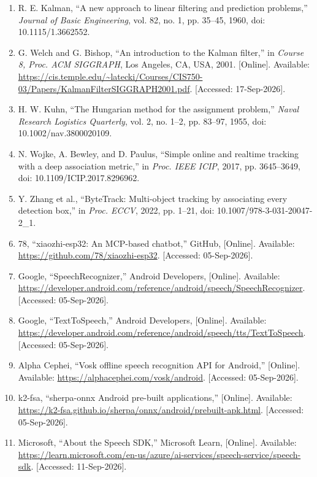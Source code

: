 \begin{enumerate}
    \item \label{ref:kalman} R. E. Kalman, ``A new approach to linear filtering and prediction problems,'' \textit{Journal of Basic Engineering}, vol. 82, no. 1, pp. 35--45, 1960, doi: 10.1115/1.3662552.
\item \label{ref:welch_bishop_kalman} G. Welch and G. Bishop, ``An introduction to the Kalman filter,'' in \textit{Course 8, Proc. ACM SIGGRAPH}, Los Angeles, CA, USA, 2001. [Online]. Available: \url{https://cis.temple.edu/~latecki/Courses/CIS750-03/Papers/KalmanFilterSIGGRAPH2001.pdf}. [Accessed: 17-Sep-2026].
    \item \label{ref:hungarian} H. W. Kuhn, ``The Hungarian method for the assignment problem,'' \textit{Naval Research Logistics Quarterly}, vol. 2, no. 1--2, pp. 83--97, 1955, doi: 10.1002/nav.3800020109.
    \item \label{ref:deepsort} N. Wojke, A. Bewley, and D. Paulus, ``Simple online and realtime tracking with a deep association metric,'' in \textit{Proc. IEEE ICIP}, 2017, pp. 3645--3649, doi: 10.1109/ICIP.2017.8296962.
    \item \label{ref:bytetrack} Y. Zhang et al., ``ByteTrack: Multi-object tracking by associating every detection box,'' in \textit{Proc. ECCV}, 2022, pp. 1--21, doi: 10.1007/978-3-031-20047-2\_1.
    \item \label{ref:xiaozhi} 78, ``xiaozhi-esp32: An MCP-based chatbot,'' GitHub, [Online]. Available: \url{https://github.com/78/xiaozhi-esp32}. [Accessed: 05-Sep-2026].
    \item \label{ref:android_speech} Google, ``SpeechRecognizer,'' Android Developers, [Online]. Available: \url{https://developer.android.com/reference/android/speech/SpeechRecognizer}. [Accessed: 05-Sep-2026].
    \item \label{ref:android_tts} Google, ``TextToSpeech,'' Android Developers, [Online]. Available: \url{https://developer.android.com/reference/android/speech/tts/TextToSpeech}. [Accessed: 05-Sep-2026].
    \item \label{ref:vosk_android} Alpha Cephei, ``Vosk offline speech recognition API for Android,'' [Online]. Available: \url{https://alphacephei.com/vosk/android}. [Accessed: 05-Sep-2026].
    \item \label{ref:sherpa_onnx} k2-fsa, ``sherpa-onnx Android pre-built applications,'' [Online]. Available: \url{https://k2-fsa.github.io/sherpa/onnx/android/prebuilt-apk.html}. [Accessed: 05-Sep-2026].
    \item \label{ref:azure_speech_sdk} Microsoft, ``About the Speech SDK,'' Microsoft Learn, [Online]. Available: \url{https://learn.microsoft.com/en-us/azure/ai-services/speech-service/speech-sdk}. [Accessed: 11-Sep-2026].

\end{enumerate}

